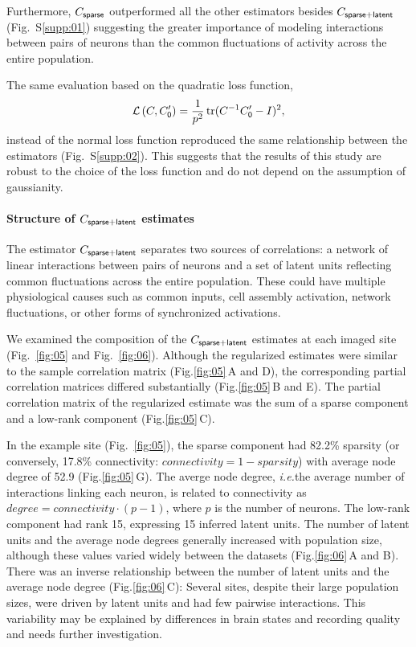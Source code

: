 \documentclass[10pt]{article}
\DeclareMathOperator{\Tr}{tr}
\newcommand{\figref}[2]{Fig.\;\ref{fig:#1}\,#2}
\newcommand{\loss}[1]{\mathcal L\left(#1\right)}
\newcommand{\ie}{\emph{i.e.}\;}
\begin{document}
Furthermore, $C_{\sf sparse}$ outperformed all the other estimators besides $C_{\sf sparse+latent}$ (Fig.~S\ref{supp:01}) suggesting the greater importance of modeling interactions between pairs of neurons than the common fluctuations of activity across the entire population.

The same evaluation based on the quadratic loss function,
\begin{equation}\label{eq:quadratic}
\loss{C,C_{\sf 0}^\prime}=\frac 1 {p^2}\Tr(C^{-1}C_{\sf 0}^\prime-I)^2,
\end{equation}
instead of the normal loss function reproduced the same relationship between the estimators (Fig.~S\ref{supp:02}). This suggests that the results of this study are robust to the choice of the loss function and do not depend on the assumption of gaussianity. 

\paragraph{Structure of $C_{\sf sparse+latent}$ estimates}
The estimator $C_{\sf sparse+latent}$ separates two sources of correlations: a network of linear interactions between pairs of neurons and a set of latent units reflecting common fluctuations across the entire population.  These could have multiple physiological causes such as common inputs, cell assembly activation, network fluctuations, or other forms of synchronized activations. 

We examined the composition of the $C_{\sf sparse+latent}$ estimates at each imaged site (Fig.~\ref{fig:05} and Fig.~\ref{fig:06}). Although the regularized estimates were similar to the sample correlation matrix (\figref{05}{A and D}), the corresponding partial correlation matrices differed substantially (\figref{05}{B and E}). The partial correlation matrix of the regularized estimate was the sum of a sparse component and a low-rank component (\figref{05}{C}).  

In the example site (Fig.~\ref{fig:05}), the sparse component had 82.2\% sparsity (or conversely, 17.8\% connectivity: $connectivity=1-sparsity$) with average node degree of 52.9 (\figref{05}{G}). The averge node degree, \ie the average number of interactions linking each neuron, is related to connectivity as $degree = connectivity\cdot(p-1)$, where $p$ is the number of neurons. The low-rank component had rank 15, expressing 15 inferred latent units. The number of latent units and the average node degrees generally increased with population size, although these values varied widely between the datasets (\figref{06}{A and B}). There was an inverse relationship between the number of latent units and the average node degree (\figref{06}{C}): Several sites, despite their large population sizes, were driven by latent units and had few pairwise interactions. This variability may be explained by differences in brain states and recording quality and needs further investigation.
\end{document}
